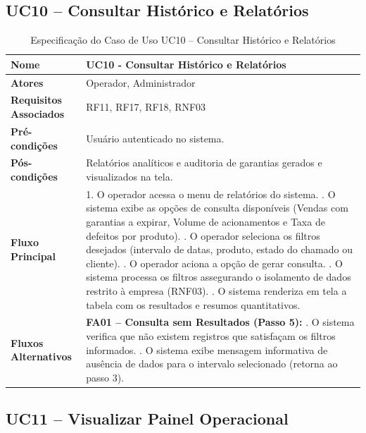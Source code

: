\subsection{UC10 – Consultar Histórico e Relatórios}

\begin{table}[H]
	\centering
	\caption{Especificação do Caso de Uso UC10 – Consultar Histórico e Relatórios}
	\label{tab:uc10}
	\begin{tabular}{|p{3.5cm}|p{11.5cm}|}
		\hline
		\textbf{Nome} & UC10 - Consultar Histórico e Relatórios \\ \hline
		\textbf{Atores} & Operador, Administrador \\ \hline
		\textbf{Requisitos Associados} & RF11, RF17, RF18, RNF03 \\ \hline
		\textbf{Pré-condições} & Usuário autenticado no sistema. \\ \hline
		\textbf{Pós-condições} & Relatórios analíticos e auditoria de garantias gerados e visualizados na tela. \\ \hline
		\textbf{Fluxo Principal} & 
		1. O operador acessa o menu de relatórios do sistema. \newline
		2. O sistema exibe as opções de consulta disponíveis (Vendas com garantias a expirar, Volume de acionamentos e Taxa de defeitos por produto). \newline
		3. O operador seleciona os filtros desejados (intervalo de datas, produto, estado do chamado ou cliente). \newline
		4. O operador aciona a opção de gerar consulta. \newline
		5. O sistema processa os filtros assegurando o isolamento de dados restrito à empresa (RNF03). \newline
		6. O sistema renderiza em tela a tabela com os resultados e resumos quantitativos. \\ \hline
		\textbf{Fluxos Alternativos} & 
		\textbf{FA01 – Consulta sem Resultados (Passo 5):} \newline
		1. O sistema verifica que não existem registros que satisfaçam os filtros informados. \newline
		2. O sistema exibe mensagem informativa de ausência de dados para o intervalo selecionado (retorna ao passo 3). \\ \hline
	\end{tabular}
\end{table}

\subsection{UC11 – Visualizar Painel Operacional}

